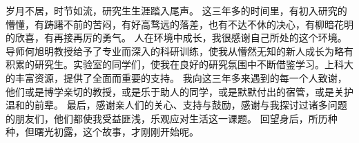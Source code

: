 
\fi


\begin{acknowledgement}
岁月不居，时节如流，研究生生涯踏入尾声。
这三年多的时间里，有初入研究的懵懂，有踌躇不前的苦闷，有好高骛远的落差，也有不达不休的决心，有柳暗花明的欣喜，有再接再厉的勇气。
人在环境中成长，我很感谢自己所处的这个环境。导师何旭明教授给予了专业而深入的科研训练，使我从懵然无知的新人成长为略有积累的研究生。实验室的同学们，使我在良好的研究氛围中不断借鉴学习。上科大的丰富资源，提供了全面而重要的支持。
我向这三年多来遇到的每一个人致谢，他们或是博学亲切的教授，或是乐于助人的同学，或是默默付出的宿管，或是关护温和的前辈。
最后，感谢亲人们的关心、支持与鼓励，感谢与我探讨过诸多问题的朋友们，他们都使我受益匪浅，乐观应对生活这一课题。
回望身后，所历种种，但曙光初露，这个故事，才刚刚开始呢。

\end{acknowledgement}